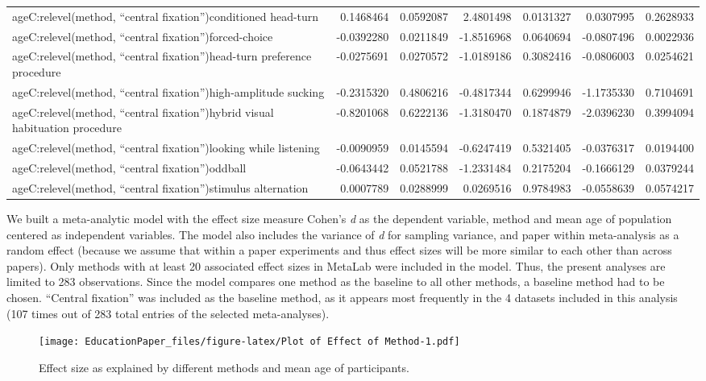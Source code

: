 \documentclass[english,floatsintext,man]{apa6}
\begin{document}
\begin{longtable}[c]{@{}lrrrrrr@{}}
ageC:relevel(method, \enquote{central fixation})conditioned head-turn &
0.1468464 & 0.0592087 & 2.4801498 & 0.0131327 & 0.0307995 &
0.2628933\tabularnewline
ageC:relevel(method, \enquote{central fixation})forced-choice &
-0.0392280 & 0.0211849 & -1.8516968 & 0.0640694 & -0.0807496 &
0.0022936\tabularnewline
ageC:relevel(method, \enquote{central fixation})head-turn preference
procedure & -0.0275691 & 0.0270572 & -1.0189186 & 0.3082416 & -0.0806003
& 0.0254621\tabularnewline
ageC:relevel(method, \enquote{central fixation})high-amplitude sucking &
-0.2315320 & 0.4806216 & -0.4817344 & 0.6299946 & -1.1735330 &
0.7104691\tabularnewline
ageC:relevel(method, \enquote{central fixation})hybrid visual
habituation procedure & -0.8201068 & 0.6222136 & -1.3180470 & 0.1874879
& -2.0396230 & 0.3994094\tabularnewline
ageC:relevel(method, \enquote{central fixation})looking while listening
& -0.0090959 & 0.0145594 & -0.6247419 & 0.5321405 & -0.0376317 &
0.0194400\tabularnewline
ageC:relevel(method, \enquote{central fixation})oddball & -0.0643442 &
0.0521788 & -1.2331484 & 0.2175204 & -0.1666129 &
0.0379244\tabularnewline
ageC:relevel(method, \enquote{central fixation})stimulus alternation &
0.0007789 & 0.0288999 & 0.0269516 & 0.9784983 & -0.0558639 &
0.0574217\tabularnewline
\bottomrule
\end{longtable}

We built a meta-analytic model with the effect size measure Cohen's
\emph{d} as the dependent variable, method and mean age of population
centered as independent variables. The model also includes the variance
of \emph{d} for sampling variance, and paper within meta-analysis as a
random effect (because we assume that within a paper experiments and
thus effect sizes will be more similar to each other than across
papers). Only methods with at least 20 associated effect sizes in
MetaLab were included in the model. Thus, the present analyses are
limited to 283 observations. Since the model compares one method as the
baseline to all other methods, a baseline method had to be chosen.
\enquote{Central fixation} was included as the baseline method, as it
appears most frequently in the 4 datasets included in this analysis (107
times out of 283 total entries of the selected meta-analyses).

\begin{figure}[htbp]
\centering
\texttt{[image: EducationPaper\_files/figure-latex/Plot of Effect of Method-1.pdf]}
\caption{Effect size as explained by different methods and mean age of
participants.}
\end{figure}
\end{document}
